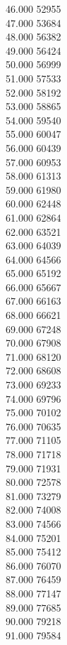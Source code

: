 { 46.000	52955 \\
 47.000	53684 \\
 48.000	56382 \\
 49.000	56424 \\
 50.000	56999 \\
 51.000	57533 \\
 52.000	58192 \\
 53.000	58865 \\
 54.000	59540 \\
 55.000	60047 \\
 56.000	60439 \\
 57.000	60953 \\
 58.000	61313 \\
 59.000	61980 \\
 60.000	62448 \\
 61.000	62864 \\
 62.000	63521 \\
 63.000	64039 \\
 64.000	64566 \\
 65.000	65192 \\
 66.000	65667 \\
 67.000	66163 \\
 68.000	66621 \\
 69.000	67248 \\
 70.000	67908 \\
 71.000	68120 \\
 72.000	68608 \\
 73.000	69233 \\
 74.000	69796 \\
 75.000	70102 \\
 76.000	70635 \\
 77.000	71105 \\
 78.000	71718 \\
 79.000	71931 \\
 80.000	72578 \\
 81.000	73279 \\
 82.000	74008 \\
 83.000	74566 \\
 84.000	75201 \\
 85.000	75412 \\
 86.000	76070 \\
 87.000	76459 \\
 88.000	77147 \\
 89.000	77685 \\
 90.000	79218 \\
 91.000	79584 \\
}
